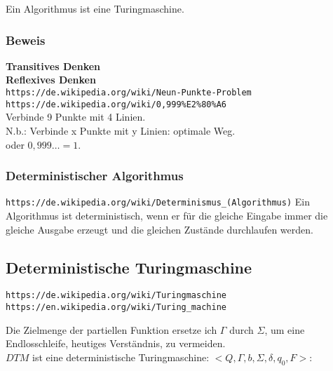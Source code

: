 \documentclass[10pt,a4paper]{article}
\begin{document}
Ein Algorithmus ist eine Turingmaschine.

\subsubsection {Beweis}

{\bf Transitives Denken}
\\

{\bf Reflexives Denken}
\\
\verb+https://de.wikipedia.org/wiki/Neun-Punkte-Problem+ \\
\verb+https://de.wikipedia.org/wiki/0,999%E2%80%A6+ \\

Verbinde 9 Punkte mit 4 Linien. \\

N.b.:
Verbinde x Punkte mit y Linien: optimale Weg. \\

oder
$0,999 \ldots = 1$.

\subsubsection {Deterministischer Algorithmus}

\verb+https://de.wikipedia.org/wiki/Determinismus_(Algorithmus)+
\vskip 8pt
Ein Algorithmus ist deterministisch, wenn er für die gleiche Eingabe immer die
gleiche Ausgabe erzeugt und die gleichen Zustände durchlaufen werden.

\subsection {Deterministische Turingmaschine}

\verb+https://de.wikipedia.org/wiki/Turingmaschine+ \\
\verb+https://en.wikipedia.org/wiki/Turing_machine+
\vskip 8pt

Die Zielmenge der partiellen Funktion ersetze ich $\Gamma$ durch $\Sigma$,
um eine Endlosschleife, heutiges Verständnis, zu vermeiden. \\

\noindent
$DTM$ ist eine deterministische Turingmaschine: $<Q, \Gamma, b, \Sigma, \delta, q_0, F >$:
\end{document}
